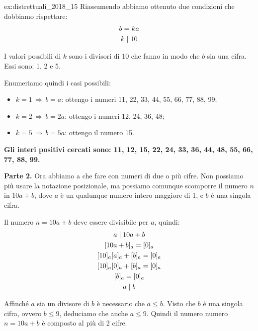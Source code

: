 \begin{soluzione}{ex:distrettuali_2018_15}
    Riassumendo abbiamo ottenuto due condizioni che dobbiamo rispettare:
    \begin{gather*}
        b = ka \\
        k  \mid  10
    \end{gather*}

    I valori possibili di $k$ sono i divisori di 10 che fanno in modo che $b$ sia una cifra.
    Essi sono: 1, 2 e 5.

    Enumeriamo quindi i casi possibili:
    \begin{itemize}
        \item $k = 1 \,\Longrightarrow\, b = a$: ottengo i numeri 11, 22, 33, 44, 55, 66, 77, 88, 99;
        \item $k = 2 \,\Longrightarrow\, b = 2a$: ottengo i numeri 12, 24, 36, 48;
        \item $k = 5 \,\Longrightarrow\, b = 5a$: ottengo il numero 15.
    \end{itemize}

    \bigskip
    \textbf{Gli interi positivi cercati sono: 11, 12, 15, 22, 24, 33, 36, 44, 48, 55, 66, 77, 88, 99.}

    \bigskip
    \textbf{Parte 2.}
    Ora abbiamo a che fare con numeri di due o più cifre.
    Non possiamo più usare la notazione posizionale, ma possiamo comunque scomporre il numero $n$ in $10a + b$,
    dove $a$ è un qualunque numero intero maggiore di 1, e $b$ è una singola cifra.

    Il numero $n = 10a + b$ deve essere divisibile per $a$, quindi:
    \begin{gather*}
        a  \mid  10a + b \\
        [10a + b]_a = [0]_a \\
        [10]_a[a]_a + [b]_a = [0]_a \\
        [10]_a[0]_a + [b]_a = [0]_a \\
        [b]_a = [0]_a \\
        a  \mid  b
    \end{gather*}

    Affinché $a$ sia un divisore di $b$ è necessario che $a \le b$.
    Visto che $b$ è una singola cifra, ovvero $b \le 9$, deduciamo che anche $a \le 9$.
    Quindi il numero numero $n = 10a + b$ è composto al più di 2 cifre.
\end{soluzione}

